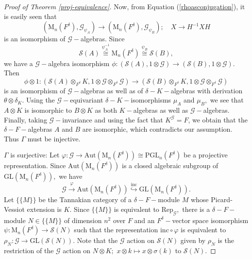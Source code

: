 \documentclass[preprint, 11pt]{amsart}
\theoremstyle{corollary}
\theoremstyle{remark}
\theoremstyle{proposition}
\numberwithin{equation}{subsection}
\begin{document}
\begin{proof}[Proof of Theorem \ref{proj-equivalence}]
	Now, from Equation (\ref{rhoasconjugation}), it is easily seen that  $$\left(\mathrm{M}_n(F^{\delta}), \mathscr G_{\psi_A}\right)\to \left(\mathrm{M}_n(F^{\delta}), \mathscr G_{\psi_B}\right);\quad X\to H^{-1}XH$$ is an isomorphism of $\mathscr G-$algebras.  Since $$\mathscr S(A)\overset{\psi^{-1}_A}{\cong} \mathrm{M}_n(F^{\delta})\overset{\psi_B}{\cong} \mathscr S(B),$$ we have a $\mathscr G-$algebra isomorphism $\phi:(\mathscr S(A), 1\otimes \mathscr G)\to(\mathscr S(B), 1\otimes \mathscr G).$  Then $$\phi\otimes 1: \left(\mathscr S(A)\otimes_{F^{\delta}} K, 1\otimes \mathscr G\otimes_{F^{\delta}} \mathscr G\right)\to \left(\mathscr S(B)\otimes_{F^{\delta}} K,1\otimes \mathscr G\otimes_{F^{\delta}} \mathscr G\right)$$ is an isomorphism of $\mathscr G-$algebras as well as of $\delta-K-$algebras with derivation $\theta\otimes \delta_K.$  Using the $\mathscr G-$equivariant $\delta-K-$isomorphisms $\mu_A$ and $\mu_B,$ we  see that $A\otimes K$ is isomorphic to $B\otimes K$ as both $K-$algebras as well as  $\mathscr G-$algebras.  Finally, taking $\mathscr G-$invariance and using the fact that $K^{\mathscr G}=F$, we obtain that the $\delta-F-$algebras $A$ and $B$ are isomorphic, which contradicts our assumption. Thus $\Gamma$ must be injective.
	
	
	 $\Gamma$ is surjective:  Let $\varphi: \mathscr G\rightarrow \mathrm{Aut}(\mathrm{M}_n(F^{\delta}))\cong \mathrm{PGL}_n(F^{\delta})$ be a projective representation. Since $\mathrm{Aut}(\mathrm{M}_n(F^{\delta}))$ is a closed algebraic subgroup of $\mathrm{GL}(\mathrm{M}_n(F^{\delta})),$ we have $$\mathscr G\overset{\varphi}{\rightarrow} \mathrm{Aut}(\mathrm{M}_n(F^{\delta}))\overset{\mathrm{inc}}{\hookrightarrow} \mathrm{GL}(\mathrm{M}_n(F^{\delta})).$$
	 Let $\{\{M\}\}$ be the Tannakian category of a $\delta-F-$module $M$ whose Picard-Vessiot extension is $K.$ Since $\{\{M\}\}$ is equivalent to $\mathrm{Rep}_{\mathscr G},$   there is a  $\delta-F-$module $N\in \{\{M\}\}$ of dimension $n^2$ over $F$  and  an $F^{\delta}-$vector space isomorphism  $\psi: \mathrm{M}_n(F^{\delta})\to \mathscr S(N)$ such that the representation $\mathrm{inc}\circ\varphi$ is equivalent to  $\rho_{N}: \mathscr G\to \mathrm{GL}(\mathscr S(N)).$  Note that the $\mathscr{G}$ action on $\mathscr S(N)$ given by $\rho_{N}$ is the restriction of the $\mathscr G$ action on $N\otimes K;$   $x\otimes k\mapsto x\otimes \sigma(k)$ to $\mathscr S(N).$
	 

\end{proof}
\end{document}
